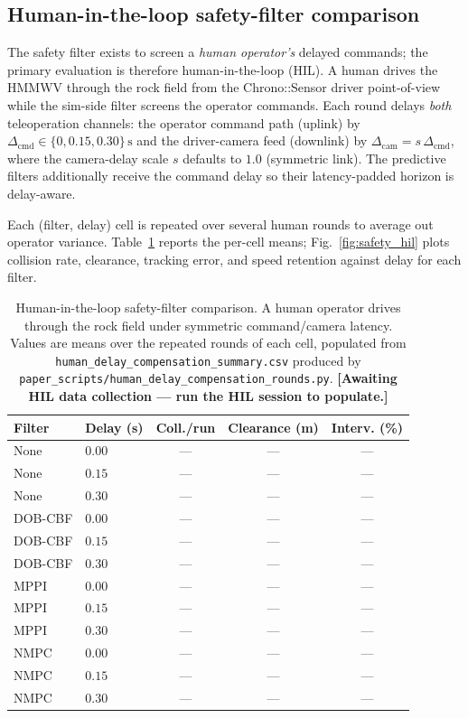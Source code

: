 \documentclass[conference,letterpaper,10pt]{IEEEtran}
\begin{document}
\subsection{Human-in-the-loop safety-filter comparison}
\label{sec:safety_hil}

The safety filter exists to screen a \emph{human operator's}
delayed commands; the primary evaluation is therefore
human-in-the-loop (HIL). A human drives the HMMWV through the rock
field from the Chrono::Sensor driver point-of-view while the
sim-side filter screens the operator commands. Each round delays
\emph{both} teleoperation channels: the operator command path
(uplink) by $\Delta_\mathrm{cmd} \in \{0, 0.15, 0.30\}\,\mathrm{s}$
and the driver-camera feed (downlink) by
$\Delta_\mathrm{cam} = s\,\Delta_\mathrm{cmd}$, where the
camera-delay scale $s$ defaults to $1.0$ (symmetric link). The
predictive filters additionally receive the command delay so their
latency-padded horizon is delay-aware.

Each (filter, delay) cell is repeated over several human rounds to
average out operator variance. Table~\ref{tab:safety_hil} reports
the per-cell means; Fig.~\ref{fig:safety_hil} plots collision rate,
clearance, tracking error, and speed retention against delay for
each filter.

\begin{table}[!t]
  \renewcommand{\arraystretch}{1.10}
  \caption{Human-in-the-loop safety-filter comparison. A human
    operator drives through the rock field under symmetric
    command/camera latency. Values are means over the repeated
    rounds of each cell, populated from
    \texttt{human\_delay\_compensation\_summary.csv} produced by
    \texttt{paper\_scripts/human\_delay\_compensation\_rounds.py}.
    \textbf{[Awaiting HIL data collection --- run the HIL session to
    populate.]}}
  \label{tab:safety_hil}
  \centering
  \begin{tabular}{llccc}
    \toprule
    \textbf{Filter} & \textbf{Delay (s)} & \textbf{Coll./run} &
    \textbf{Clearance (m)} & \textbf{Interv. (\%)}\\
    \midrule
    None    & $0.00$ & --- & --- & ---\\
    None    & $0.15$ & --- & --- & ---\\
    None    & $0.30$ & --- & --- & ---\\
    \addlinespace
    DOB-CBF & $0.00$ & --- & --- & ---\\
    DOB-CBF & $0.15$ & --- & --- & ---\\
    DOB-CBF & $0.30$ & --- & --- & ---\\
    \addlinespace
    MPPI    & $0.00$ & --- & --- & ---\\
    MPPI    & $0.15$ & --- & --- & ---\\
    MPPI    & $0.30$ & --- & --- & ---\\
    \addlinespace
    NMPC    & $0.00$ & --- & --- & ---\\
    NMPC    & $0.15$ & --- & --- & ---\\
    NMPC    & $0.30$ & --- & --- & ---\\
    \bottomrule
  \end{tabular}
\end{table}
\end{document}
